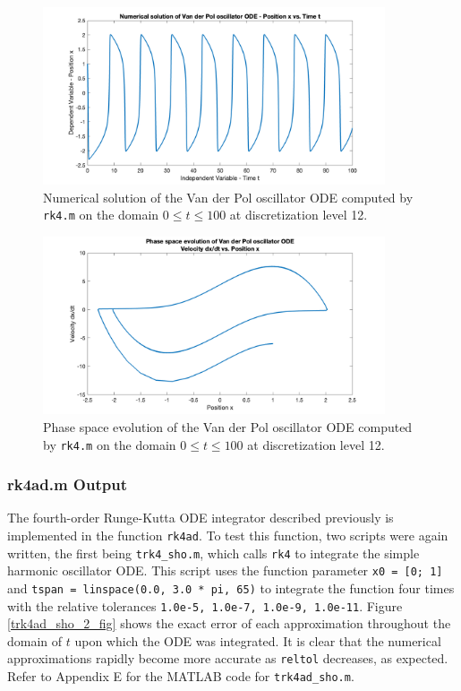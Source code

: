 \documentclass[10pt]{article}
\def\code#1{\texttt{#1}} %
\begin{document}
\begin{figure}[H]
\centering
\includegraphics[width=0.9\textwidth]{trk4_vdp_1.png}
\caption{Numerical solution of the Van der Pol oscillator ODE computed by \code{rk4.m} on the domain
$0 \leq t \leq 100$ at discretization level 12.}\label{trk4_vdp_1_fig}
\end{figure}

\begin{figure}[H]
\centering
\includegraphics[width=0.9\textwidth]{trk4_vdp_2.png}
\caption{Phase space evolution of the Van der Pol oscillator ODE computed by \code{rk4.m} on the domain
$0 \leq t \leq 100$ at discretization level 12.}\label{trk4_vdp_2_fig}
\end{figure}

\subsubsection*{rk4ad.m Output}

The fourth-order Runge-Kutta ODE integrator described previously is implemented in the function 
\code{rk4ad}. To test this function, two scripts were again written, the first being \code{trk4\_sho.m}, 
which calls \code{rk4} to integrate the simple harmonic oscillator ODE. This script uses the function
parameter \code{x0 = [0; 1]} and \code{tspan = linspace(0.0, 3.0 * pi, 65)} to integrate the function 
four times with the relative tolerances \code{1.0e-5, 1.0e-7, 1.0e-9, 1.0e-11}. Figure 
\ref{trk4ad_sho_2_fig} shows the exact error of each approximation throughout the domain of $t$ upon 
which the ODE was integrated. It is clear that the numerical approximations rapidly become more 
accurate as \code{reltol} decreases, as expected. Refer to Appendix E for the MATLAB code for 
\code{trk4ad\_sho.m}.
\end{document}
